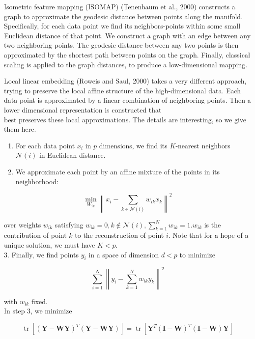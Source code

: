 \documentclass[10pt]{article}
\begin{document}
Isometric feature mapping (ISOMAP) (Tenenbaum et al., 2000) constructs a graph to approximate the geodesic distance between points along the manifold. Specifically, for each data point we find its neighbors-points within some small Euclidean distance of that point. We construct a graph with an edge between any two neighboring points. The geodesic distance between any two points is then approximated by the shortest path between points on the graph. Finally, classical scaling is applied to the graph distances, to produce a low-dimensional mapping.

Local linear embedding (Roweis and Saul, 2000) takes a very different approach, trying to preserve the local affine structure of the high-dimensional data. Each data point is approximated by a linear combination of neighboring points. Then a lower dimensional representation is constructed that\\
best preserves these local approximations. The details are interesting, so we give them here.

\begin{enumerate}
  \item For each data point $x_{i}$ in $p$ dimensions, we find its $K$-nearest neighbors $\mathcal{N}(i)$ in Euclidean distance.
  \item We approximate each point by an affine mixture of the points in its neighborhood:
\end{enumerate}


\begin{equation*}
\min _{W_{i k}}\left\|x_{i}-\sum_{k \in \mathcal{N}(i)} w_{i k} x_{k}\right\|^{2} \tag{14.102}
\end{equation*}


over weights $w_{i k}$ satisfying $w_{i k}=0, k \notin \mathcal{N}(i), \sum_{k=1}^{N} w_{i k}=1 . w_{i k}$ is the contribution of point $k$ to the reconstruction of point $i$. Note that for a hope of a unique solution, we must have $K<p$.\\
3. Finally, we find points $y_{i}$ in a space of dimension $d<p$ to minimize


\begin{equation*}
\sum_{i=1}^{N}\left\|y_{i}-\sum_{k=1}^{N} w_{i k} y_{k}\right\|^{2} \tag{14.103}
\end{equation*}


with $w_{i k}$ fixed.\\
In step 3, we minimize


\begin{equation*}
\operatorname{tr}\left[(\mathbf{Y}-\mathbf{W} \mathbf{Y})^{T}(\mathbf{Y}-\mathbf{W} \mathbf{Y})\right]=\operatorname{tr}\left[\mathbf{Y}^{T}(\mathbf{I}-\mathbf{W})^{T}(\mathbf{I}-\mathbf{W}) \mathbf{Y}\right] \tag{14.104}
\end{equation*}
\end{document}
